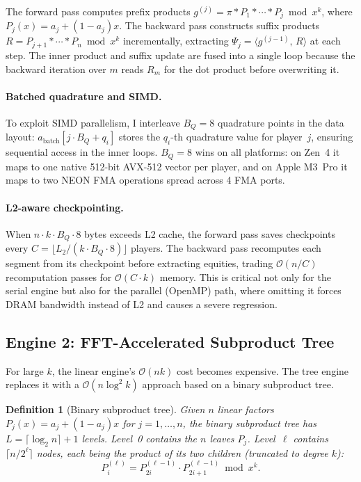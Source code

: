 \documentclass[11pt]{article}
\newtheorem{definition}[theorem]{Definition}
\newcommand{\bigO}{\mathcal{O}}
\newcommand{\ip}[2]{\langle #1,\, #2 \rangle}
\begin{document}
The forward pass computes prefix products $g^{(j)} = \pi * P_1 * \cdots
* P_j \bmod x^k$, where $P_j(x) = a_j + (1-a_j)x$. The backward pass
constructs suffix products $R = P_{j+1} * \cdots * P_n \bmod x^k$
incrementally, extracting $\Psi_j = \ip{g^{(j-1)}}{R}$ at each step.
The inner product and suffix update are fused into a single loop because
the backward iteration over $m$ reads $R_m$ for the dot product before
overwriting it.

\paragraph{Batched quadrature and SIMD.}
To exploit SIMD parallelism, I interleave $B_Q = 8$ quadrature points in the
data layout: $a_{\text{batch}}[j \cdot B_Q + q_i]$ stores the $q_i$-th
quadrature value for player~$j$, ensuring sequential access in the inner
loops. $B_Q = 8$ wins on all platforms: on Zen~4 it maps to one native
512-bit AVX-512 vector per player, and on Apple M3~Pro it maps to two
NEON FMA operations spread across 4 FMA ports.

\paragraph{L2-aware checkpointing.}
When $n \cdot k \cdot B_Q \cdot 8$ bytes exceeds L2 cache, the forward
pass saves checkpoints every $C = \lfloor L_2 / (k \cdot B_Q \cdot 8)
\rfloor$ players. The backward pass recomputes each segment from its
checkpoint before extracting equities, trading $\bigO(n/C)$ recomputation
passes for $\bigO(C \cdot k)$ memory. This is critical not only for the
serial engine but also for the parallel (OpenMP) path, where omitting it
forces DRAM bandwidth instead of L2 and causes a severe regression.

\subsection{Engine 2: FFT-Accelerated Subproduct Tree}\label{sec:tree}

For large $k$, the linear engine's $\bigO(nk)$ cost becomes expensive.
The tree engine replaces it with a $\bigO(n \log^2 k)$ approach based on
a binary subproduct tree.

\begin{definition}[Binary subproduct tree]
Given $n$ linear factors $P_j(x) = a_j + (1-a_j)x$ for $j = 1, \ldots, n$,
the binary subproduct tree has $L = \lceil \log_2 n \rceil + 1$ levels.
Level~0 contains the $n$ leaves $P_j$. Level~$\ell$ contains
$\lceil n / 2^\ell \rceil$ nodes, each being the product of its two
children (truncated to degree $k$):
\[
  P^{(\ell)}_i = P^{(\ell-1)}_{2i} \cdot P^{(\ell-1)}_{2i+1} \bmod x^k.
\]
\end{definition}
\end{document}
